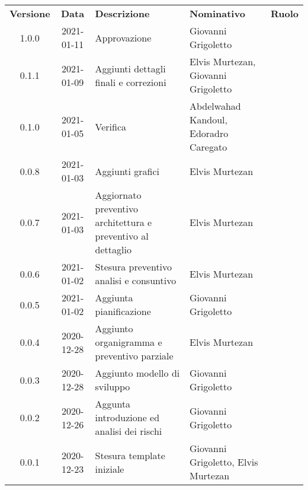 {
    \renewcommand{\arraystretch}{1.5}
    \centering
    \begin{longtable}{ c c  C{3.5cm}  C{3.5cm}  c }
        \rowcolor{\primaryColor}
        \textcolor{\secondaryColor}{
        \textbf{Versione}}     & \textcolor{\secondaryColor}{\textbf{Data}}       & \textcolor{\secondaryColor}
        {\textbf{Descrizione}} & \textcolor{\secondaryColor}{\textbf{Nominativo}} & \textcolor{\secondaryColor}{\textbf{Ruolo}}                          \\


        1.0.0  & 
        2021-01-11  & 
        Approvazione & 
        Giovanni Grigoletto & 
        \responsabile{} \\

        0.1.1  & 
        2021-01-09 & 
        Aggiunti dettagli finali e correzioni & 
        Elvis Murtezan, Giovanni Grigoletto  & 
        \redattore{} \\

        0.1.0  & 
        2021-01-05 & 
        Verifica & 
        Abdelwahad Kandoul, Edoradro Caregato  & 
        \verificatore{} \\

        0.0.8  & 
        2021-01-03 & 
        Aggiunti grafici & 
        Elvis Murtezan  & 
        \redattore{} \\

        0.0.7  & 
        2021-01-03 & 
        Aggiornato preventivo architettura e preventivo al dettaglio & 
        Elvis Murtezan  & 
        \redattore{} \\

        0.0.6  & 
        2021-01-02 & 
        Stesura preventivo analisi e consuntivo & 
        Elvis Murtezan  & 
        \redattore{} \\

        0.0.5  & 
        2021-01-02 & 
        Aggiunta pianificazione & 
        Giovanni Grigoletto & 
        \redattore{} \\

        0.0.4  & 
        2020-12-28 & 
        Aggiunto organigramma e preventivo parziale & 
        Elvis Murtezan  & 
        \redattore{} \\

        0.0.3  & 
        2020-12-28 & 
        Aggiunto modello di sviluppo & 
        Giovanni Grigoletto & 
        \redattore{} \\
        
        0.0.2  & 
        2020-12-26 & 
        Aggunta introduzione ed analisi dei rischi & 
        Giovanni Grigoletto & 
        \redattore{} \\

        0.0.1  & 
        2020-12-23 & 
        Stesura template iniziale & 
        Giovanni Grigoletto, Elvis Murtezan & 
        \redattore{} \\
    \end{longtable}
}